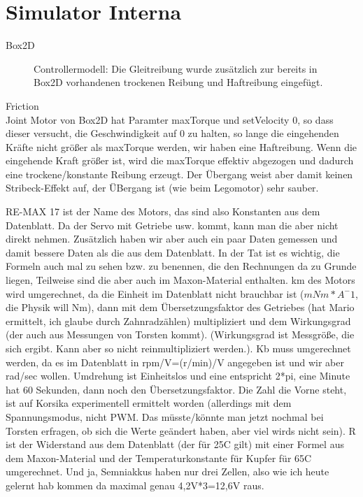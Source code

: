 \documentclass[10pt,a4paper]{article}
\begin{document}
\section{Simulator Interna}

Box2D\\

\begin{figure}[H]
    \centering
    
    \caption{Controllermodell: Die Gleitreibung wurde zusätzlich zur bereits in Box2D vorhandenen trockenen Reibung und Haftreibung eingefügt.}
    \label{fig:controllermodell}
\end{figure}

Friction\\

Joint Motor von Box2D hat Paramter maxTorque und setVelocity 0, so dass dieser versucht, die Geschwindigkeit auf 0 zu halten, so lange die eingehenden Kräfte nicht größer als maxTorque werden, wir haben eine Haftreibung. Wenn die eingehende Kraft größer ist, wird die maxTorque effektiv abgezogen und dadurch eine trockene/konstante Reibung erzeugt.
Der Übergang weist aber damit keinen Stribeck-Effekt auf, der ÜBergang ist (wie beim Legomotor) sehr sauber.

RE-MAX 17 ist der Name des Motors, das sind also Konstanten aus dem Datenblatt.
Da der Servo mit Getriebe usw. kommt, kann man die aber nicht direkt nehmen.
Zusätzlich haben wir aber auch ein paar Daten gemessen und damit bessere Daten als die aus dem Datenblatt. In der Tat ist es wichtig, die Formeln auch mal zu sehen bzw. zu benennen, die den Rechnungen da zu Grunde liegen, Teilweise sind die aber auch im Maxon-Material enthalten.
km des Motors wird umgerechnet, da die Einheit im Datenblatt nicht brauchbar ist ($mNm*A^-1$, die Physik will Nm), dann mit dem Übersetzungsfaktor des Getriebes (hat Mario ermittelt, ich glaube durch Zahnradzählen) multipliziert und dem Wirkungsgrad (der auch aus Messungen von Torsten kommt). (Wirkungsgrad ist Messgröße, die sich ergibt. Kann aber so nicht reinmultipliziert werden.).
Kb muss umgerechnet werden, da es im Datenblatt in rpm/V=(r/min)/V angegeben ist und wir aber rad/sec wollen. Umdrehung ist Einheitslos und eine entspricht 2*pi, eine Minute hat 60 Sekunden, dann noch den Übersetzungsfaktor. Die Zahl die Vorne steht, ist auf Korsika experimentell ermittelt worden (allerdings mit dem Spannungsmodus, nicht PWM. Das müsste/könnte man jetzt nochmal bei Torsten erfragen, ob sich die Werte geändert haben, aber viel wirds nicht sein).
R ist der Widerstand aus dem Datenblatt (der für 25C gilt) mit einer Formel aus dem Maxon-Material und der Temperaturkonstante für Kupfer für 65C umgerechnet. 
Und ja, Semniakkus haben nur drei Zellen, also wie ich heute gelernt hab kommen da maximal genau 4,2V*3=12,6V raus.
\end{document}
